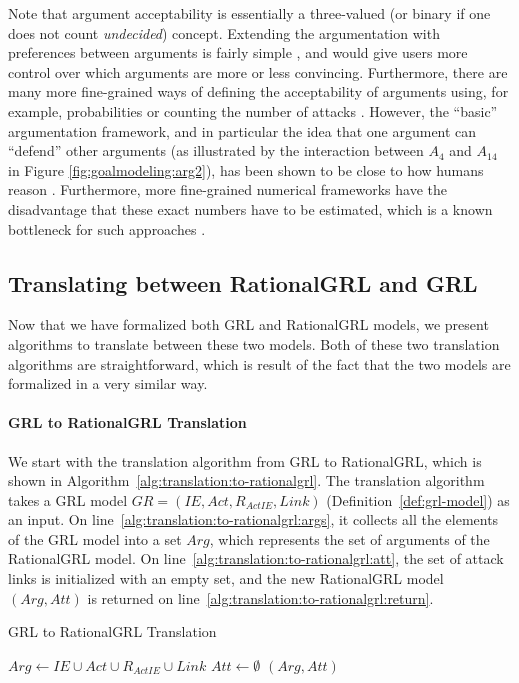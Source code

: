 Note that argument acceptability is essentially a three-valued (or binary if one does not count \emph{undecided}) concept. Extending the argumentation with preferences between arguments is fairly simple \cite{atkinson2007}, and would give users more control over which arguments are more or less convincing. Furthermore, there are many more fine-grained ways of defining the acceptability of arguments using, for example, probabilities \cite{li2011probabilistic} or counting the number of attacks \cite{grossi2015graded}. However, the ``basic'' argumentation framework, and in particular the idea that one argument can ``defend'' other arguments (as illustrated by the interaction between $A_4$ and $A_{14}$ in Figure \ref{fig:goalmodeling:arg2}), has been shown to be close to how humans reason \cite{rahwan2010behavioral}. Furthermore, more fine-grained numerical frameworks have the disadvantage that these exact numbers have to be estimated, which is a known bottleneck for such approaches \cite{druzdzel2000building}.

\subsection{Translating between RationalGRL and GRL}
\label{sect:formalframework:translation}

Now that we have formalized both GRL and RationalGRL models, we present algorithms to translate between these two models. Both of these two translation algorithms are straightforward, which is result of the fact that the two models are formalized in a very similar way.

\paragraph{GRL to RationalGRL Translation} We start with the translation algorithm from GRL to RationalGRL, which is shown in Algorithm~\ref{alg:translation:to-rationalgrl}. The translation algorithm takes a GRL model $GR=(IE, Act, R_{ActIE}, Link)$ (Definition~\ref{def:grl-model}) as an input. On line~\ref{alg:translation:to-rationalgrl:args}, it collects all the elements of the GRL model into a set $Arg$, which represents the set of arguments of the RationalGRL model. On line~\ref{alg:translation:to-rationalgrl:att}, the set of attack links is initialized with an empty set, and the new RationalGRL model $(Arg, Att)$ is returned on line~\ref{alg:translation:to-rationalgrl:return}.

\begin{algorithm}[ht]
  \caption{GRL to RationalGRL Translation}
  \label{alg:translation:to-rationalgrl}
  \begin{algorithmic}[1]
    \State $Arg \leftarrow IE\cup Act \cup R_{ActIE}\cup Link$\label{alg:translation:to-rationalgrl:args}
    \State $Att \leftarrow \emptyset$\label{alg:translation:to-rationalgrl:att}
    \State \Return $(Arg, Att)$\label{alg:translation:to-rationalgrl:return}
    \EndProcedure
  \end{algorithmic}
\end{algorithm}

